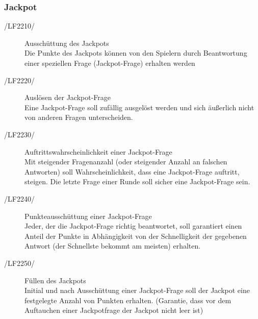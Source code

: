 \documentclass[11pt,a4paper]{scrreprt}
\begin{document}
\subsubsection{Jackpot}
\begin{description}
\item[/LF2210/] Ausschüttung des Jackpots \\
Die Punkte des Jackpots können von den Spielern durch Beantwortung einer speziellen Frage (Jackpot-Frage) erhalten werden

\item[/LF2220/]Auslösen der Jackpot-Frage \\
Eine Jackpot-Frage soll zufällig ausgelöst werden und sich äußerlich nicht von anderen Fragen unterscheiden.

\item[/LF2230/] Auftrittswahrscheinlichkeit einer Jackpot-Frage \\
Mit steigender Fragenanzahl (oder steigender Anzahl an falschen Antworten) soll Wahrscheinlichkeit, dass eine Jackpot-Frage auftritt, steigen. Die letzte Frage einer Runde soll sicher eine Jackpot-Frage sein.

\item[/LF2240/] Punkteausschüttung einer Jackpot-Frage \\
Jeder, der die Jackpot-Frage richtig beantwortet, soll garantiert einen Anteil der Punkte in Abhängigkeit von der Schnelligkeit der gegebenen Antwort (der Schnellste bekommt am meisten) erhalten.

\item[/LF2250/] Füllen des Jackpots \\
Initial und nach Ausschüttung einer Jackpot-Frage soll der Jackpot eine festgelegte Anzahl von Punkten erhalten. (Garantie, dass vor dem Auftauchen einer Jackpotfrage der Jackpot nicht leer ist)

\end{description}
\end{document}
